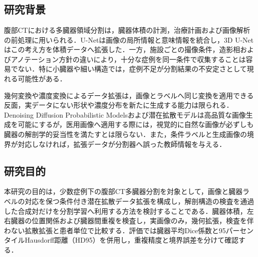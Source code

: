 \chapter{\UsamiIntroductionTitle}

\begin{center}
  \UsamiFictionalExampleNotice
\end{center}

\section{研究背景}

腹部CTにおける多臓器領域分割は，臓器体積の計測，治療計画および画像解析の前処理に用いられる．U-Net\cite{ronneberger2015unet}は画像の局所情報と意味情報を統合し，3D U-Net\cite{cicek20163dunet}はこの考え方を体積データへ拡張した．一方，施設ごとの撮像条件，造影相およびアノテーション方針の違いにより，十分な症例を同一条件で収集することは容易でない．特に小臓器や細い構造では，症例不足が分割結果の不安定さとして現れる可能性がある．

幾何変換や濃度変換によるデータ拡張は，画像とラベルへ同じ変換を適用できる反面，実データにない形状や濃度分布を新たに生成する能力は限られる．Denoising Diffusion Probabilistic Models\cite{ho2020ddpm}および潜在拡散モデル\cite{rombach2022ldm}は高品質な画像生成を可能にするが，医用画像へ適用する際には，視覚的に自然な画像が必ずしも臓器の解剖学的妥当性を満たすとは限らない．また，条件ラベルと生成画像の境界が対応しなければ，拡張データが分割器へ誤った教師情報を与える．

\section{研究目的}

本研究の目的は，少数症例下の腹部CT多臓器分割を対象として，画像と臓器ラベルの対応を保つ条件付き潜在拡散データ拡張を構成し，解剖構造の検査を通過した合成対だけを分割学習へ利用する方法を検討することである．臓器体積，左右臓器の位置関係および臓器間重複を検査し，実画像のみ，幾何拡張，検査を伴わない拡散拡張と患者単位で比較する．評価では臓器平均Dice係数と95パーセンタイルHausdorff距離（HD95）を併用し，重複精度と境界誤差を分けて確認する．

